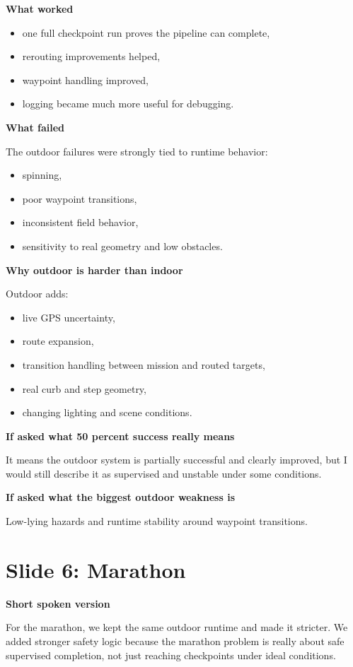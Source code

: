 \documentclass[11pt]{article}
\begin{document}
\textbf{What worked}
\begin{itemize}[leftmargin=*]
\item one full checkpoint run proves the pipeline can complete,
\item rerouting improvements helped,
\item waypoint handling improved,
\item logging became much more useful for debugging.
\end{itemize}

\textbf{What failed}

The outdoor failures were strongly tied to runtime behavior:
\begin{itemize}[leftmargin=*]
\item spinning,
\item poor waypoint transitions,
\item inconsistent field behavior,
\item sensitivity to real geometry and low obstacles.
\end{itemize}

\textbf{Why outdoor is harder than indoor}

Outdoor adds:
\begin{itemize}[leftmargin=*]
\item live GPS uncertainty,
\item route expansion,
\item transition handling between mission and routed targets,
\item real curb and step geometry,
\item changing lighting and scene conditions.
\end{itemize}

\textbf{If asked what 50 percent success really means}

It means the outdoor system is partially successful and clearly improved, but I would still describe it as supervised and unstable under some conditions.

\textbf{If asked what the biggest outdoor weakness is}

Low-lying hazards and runtime stability around waypoint transitions.

\section*{Slide 6: Marathon}
\textbf{Short spoken version}

For the marathon, we kept the same outdoor runtime and made it stricter. We added stronger safety logic because the marathon problem is really about safe supervised completion, not just reaching checkpoints under ideal conditions.
\end{document}
